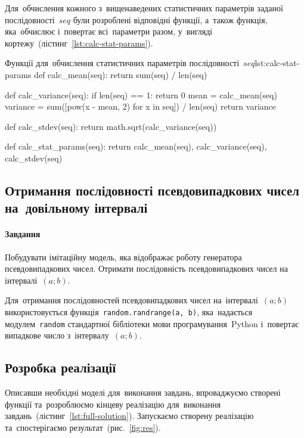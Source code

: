 \documentclass[
	a4paper,
	oneside,
	BCOR = 10mm,
	DIV = 12,
	12pt,
	headings = normal,
]{scrartcl}
\newcommand{\modulename}[1]{\texttt{#1}}
\newcommand{\longvar}[1]{\mathit{#1}}
\begin{document}
			Для~обчислення кожного з~вищенаведених статистичних параметрів заданої послідовності~$\longvar{seq}$ були розроблені відповідні функції, а~також функція, яка~обчислює і~повертає всі~параметри разом, у~вигляді кортежу~(лістинг~\ref{lst:calc-stat-params}).

				\begin{listingpython}{Функції для~обчислення статистичних параметрів послідовності~$\longvar{seq}$}{lst:calc-stat-params}
def calc_mean(seq):
    return sum(seq) / len(seq)

def calc_variance(seq):
    if len(seq) == 1:
        return 0
    mean = calc_mean(seq)
    variance = sum([pow(x - mean, 2) for x in seq]) / len(seq)
    return variance

def calc_stdev(seq):
    return math.sqrt(calc_variance(seq))

def calc_stat_params(seq):
    return calc_mean(seq), calc_variance(seq), calc_stdev(seq)
				\end{listingpython}

		\subsection{Отримання послідовності псевдовипадкових чисел на~довільному інтервалі}
			\paragraph{Завдання}
			Побудувати імітаційну модель, яка відображає роботу генератора псевдовипадкових чисел. Отримати послідовність псевдовипадкових чисел на інтервалі~$(a; b)$.

			Для~отримання послідовностей псевдовипадкових чисел на~інтервалі~$(a; b)$ використовується функція~\texttt{random.randrange(a, b)}, яка~надається модулем~\modulename{random} стандартної бібліотеки мови програмування~\textenglish{Python} і~повертає випадкове число з~інтервалу~$(a; b)$.

		\subsection{Розробка реалізації}
			Описавши необхідні моделі для~виконання завдань, впроваджуємо створені функції та~розроблюємо кінцеву реалізацію для~виконання завдань~(лістинг~\ref{lst:full-solution}). Запускаємо створену реалізацію та~спостерігаємо результат~(рис.~\ref{fig:res}).
\end{document}

